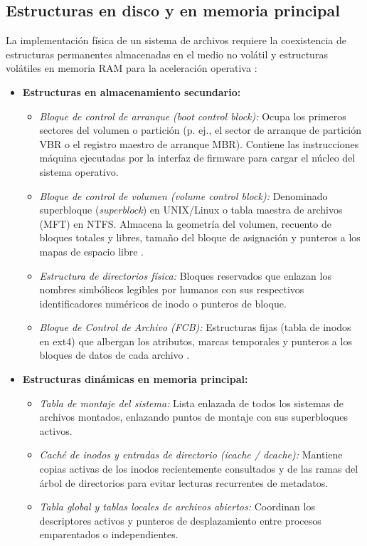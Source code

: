 \documentclass[12pt]{article}
\begin{document}
\subsection{Estructuras en disco y en memoria principal}
\label{subsec:estructurasDiscoMemoria}

La implementación física de un sistema de archivos requiere la coexistencia de estructuras permanentes almacenadas en el medio no volátil y estructuras volátiles en memoria RAM para la aceleración operativa \parencite[\S 11.2, pp.\ 372--374]{silberschatz2006fundamentos}:

\begin{itemize}[noitemsep, topsep=2pt]
    \item \textbf{Estructuras en almacenamiento secundario:}
    \begin{itemize}[noitemsep, topsep=1pt]
        \item \textit{Bloque de control de arranque (\textit{boot control block}):} Ocupa los primeros sectores del volumen o partición (p. ej., el sector de arranque de partición VBR o el registro maestro de arranque MBR). Contiene las instrucciones máquina ejecutadas por la interfaz de firmware para cargar el núcleo del sistema operativo.
        \item \textit{Bloque de control de volumen (\textit{volume control block}):} Denominado superbloque (\textit{superblock}) en UNIX/Linux o tabla maestra de archivos (MFT) en NTFS. Almacena la geometría del volumen, recuento de bloques totales y libres, tamaño del bloque de asignación y punteros a los mapas de espacio libre \parencite[\S 11.2, p.\ 373]{silberschatz2006fundamentos}.
        \item \textit{Estructura de directorios física:} Bloques reservados que enlazan los nombres simbólicos legibles por humanos con sus respectivos identificadores numéricos de inodo o punteros de bloque.
        \item \textit{Bloque de Control de Archivo (FCB):} Estructuras fijas (tabla de inodos en ext4) que albergan los atributos, marcas temporales y punteros a los bloques de datos de cada archivo \parencite[\S 8.5.1, p.\ 461]{carretero2001sistemas}.
    \end{itemize}
    \item \textbf{Estructuras dinámicas en memoria principal:}
    \begin{itemize}[noitemsep, topsep=1pt]
        \item \textit{Tabla de montaje del sistema:} Lista enlazada de todos los sistemas de archivos montados, enlazando puntos de montaje con sus superbloques activos.
        \item \textit{Caché de inodos y entradas de directorio (\textit{icache / dcache}):} Mantiene copias activas de los inodos recientemente consultados y de las ramas del árbol de directorios para evitar lecturas recurrentes de metadatos.
        \item \textit{Tabla global y tablas locales de archivos abiertos:} Coordinan los descriptores activos y punteros de desplazamiento entre procesos emparentados o independientes.
    \end{itemize}
\end{itemize}
\end{document}

